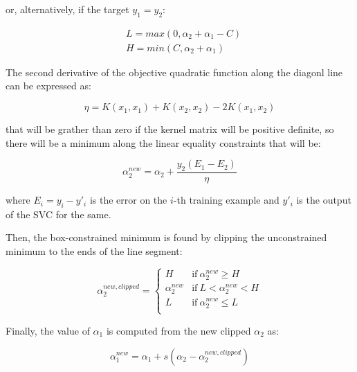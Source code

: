 or, alternatively, if the target $y_1 = y_2$:

\begin{equation} \label{eq:smo_svc_bounds_update2}
	\begin{aligned}
		& L = max(0, \alpha_2 + \alpha_1 - C) \\
		& H = min(C, \alpha_2 + \alpha_1)
	\end{aligned}
\end{equation}

The second derivative of the objective quadratic function along the diagonl line can be expressed as:

\begin{equation} \label{eq:smo_eta}
	\eta = K(x_1, x_1) + K(x_2, x_2) - 2K(x_1, x_2)
\end{equation}

that will be grather than zero if the kernel matrix will be positive definite, so there will be a minimum along the linear equality constraints that will be:

\begin{equation} \label{eq:smo_svc_a2_new}
	\alpha_2^{new} = \alpha_2 + \frac{y_2(E_1 - E_2)}{\eta}
\end{equation}

where $E_i = y_i - y'_i$ is the error on the $i$-th training example and $y'_i$ is the output of the SVC for the same.

Then, the box-constrained minimum is found by clipping the unconstrained minimum to the ends of the line segment:

\begin{equation} \label{eq:smo_svc_a2_new_clipped}
    \alpha_2^{new,clipped} =
        \begin{cases}
            H & \text{if} \ \alpha_2^{new} \geq H \\
            \alpha_2^{new} & \text{if} \ L < \alpha_2^{new} < H \\
            L & \text{if} \ \alpha_2^{new} \leq L \\
        \end{cases}
\end{equation}

Finally, the value of $\alpha_1$ is computed from the new clipped $\alpha_2$ as:

\begin{equation} \label{eq:smo_svc_a1_new}
	\alpha_1^{new} = \alpha_1 + s (\alpha_2 - \alpha_2^{new,clipped})
\end{equation}


